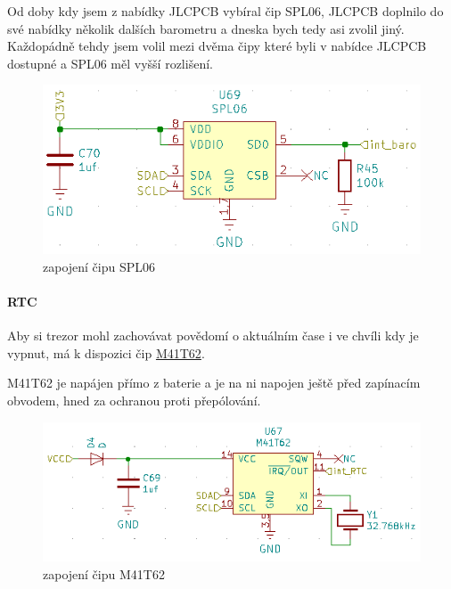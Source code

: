 Od doby kdy jsem z nabídky JLCPCB vybíral čip SPL06, JLCPCB doplnilo do své nabídky několik dalších barometru a dneska bych tedy asi zvolil jiný. Každopádně tehdy jsem volil 
mezi dvěma čipy které byli v nabídce JLCPCB dostupné a SPL06 měl vyšší rozlišení.

\begin{figure}[htbp]
    \centering
    \includegraphics[width=\textwidth]{kapitoly/obrazky/E4/vnimani/SPL06.png}
    \caption{zapojení čipu SPL06}
    \label{fig:E4-SPL06}
\end{figure}

\newpage

\paragraph{RTC}
Aby si trezor mohl zachovávat povědomí o aktuálním čase i ve chvíli kdy je vypnut, má k dispozici čip \href{https://datasheet.lcsc.com/szlcsc/STMicroelectronics-M41T62Q6F_C113207.pdf}{M41T62}.

M41T62 je napájen přímo z baterie a je na ni napojen ještě před zapínacím obvodem, hned za ochranou proti přepólování.

\begin{figure}[htbp]
    \centering
    \includegraphics[width=\textwidth]{kapitoly/obrazky/E4/vnimani/RTC.png}
    \caption{zapojení čipu M41T62}
    \label{fig:E4-M41T62}
\end{figure}

